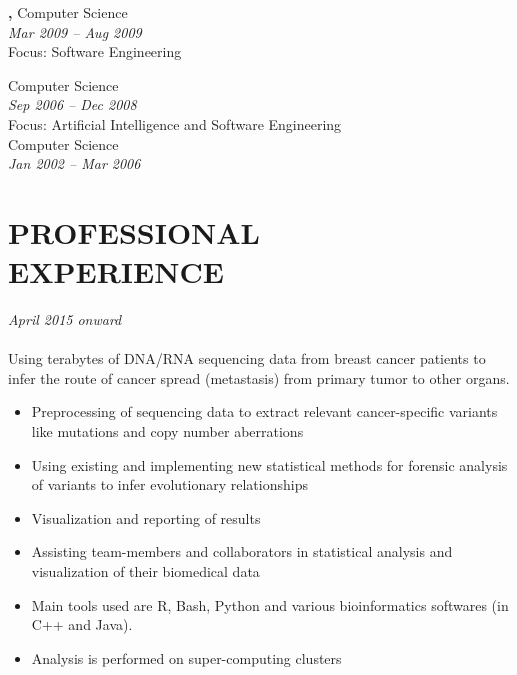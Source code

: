 \documentclass[margin, 10pt]{res} %
\begin{document}
\begin{resume}
{\bf \color{Black}{Exchange Student},} Computer Science \\
{\color{RubineRed}{University of Limerick, Ireland}} \hfill \textit{Mar 2009 -- Aug 2009} \\
Focus: Software Engineering 

{\bf \color{Black}{Master of Science,}} Computer Science \\ %
{\color{RubineRed}{Lahore University of Management Sciences, Pakistan}} \hfill \textit{Sep 2006 -- Dec 2008} \\
Focus: Artificial Intelligence and Software Engineering \\

{\bf \color{Black}{Bachelor of Science,}} Computer Science \\ %
{\color{RubineRed}{University of Peshawar, Pakistan}} \hfill \textit{Jan 2002 -- Mar 2006} \\


\section{PROFESSIONAL \\ EXPERIENCE}

{\sl \textbf{}} \hfill \textit{April 2015 onward} \\
{\color{RubineRed}{Radiumhemmet, Karolinska Hospital}} \\
Using terabytes of DNA/RNA sequencing data from breast cancer patients to infer the route of cancer spread (metastasis) from primary tumor to other organs. 
\begin{itemize} 
\item Preprocessing of sequencing data to extract relevant cancer-specific variants like mutations and copy number aberrations
\item Using existing and implementing new statistical methods for forensic analysis of variants to infer evolutionary relationships
\item Visualization and reporting of results
\item Assisting team-members and collaborators in statistical analysis and visualization of their biomedical data 
\item Main tools used are R, Bash, Python and various bioinformatics softwares (in C++ and Java). 
\item Analysis is performed on super-computing clusters
\end{itemize} 


\end{resume}
\end{document}
